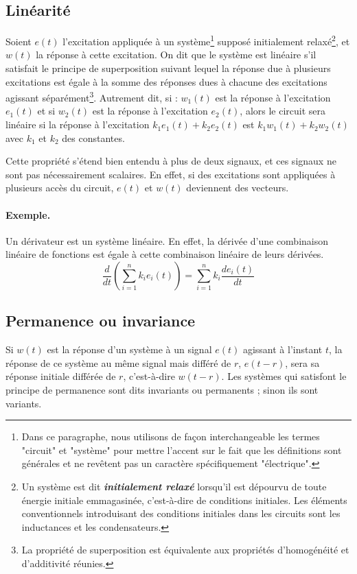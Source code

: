 \subsection{Linéarité}
Soient $e(t)$ l'excitation appliquée à un système\footnote{Dans ce paragraphe, nous utilisons de façon interchangeable les termes "circuit" et "système" pour mettre l'accent sur le fait que les définitions sont générales et ne revêtent pas un caractère spécifiquement "électrique".} supposé initialement relaxé\footnote{Un système est dit \textit{\textbf{initialement relaxé}} lorsqu'il est dépourvu de toute énergie initiale emmagasinée, c'est-à-dire de conditions initiales. Les éléments conventionnels introduisant des conditions initiales dans les circuits sont les inductances et les condensateurs.}, et 
$w(t)$ la réponse à cette excitation. On dit que le système est linéaire s'il satisfait le principe de superposition suivant lequel la réponse due à plusieurs excitations est égale à la somme des réponses dues à chacune des excitations agissant séparément\footnote{La propriété de superposition est équivalente aux propriétés d'homogénéité et d'additivité réunies.}. Autrement dit, si :
$w_1(t)$ est la réponse à l'excitation $e_1(t)$ et si
$w_2(t)$ est la réponse à l'excitation $e_2(t)$,
alors le circuit sera linéaire si la réponse à l'excitation
$k_1 e_1(t) + k_2 e_2(t)$ est $k_1 w_1(t) + k_2 w_2(t)$
avec $k_1$ et $k_2$ des constantes.

Cette propriété s'étend bien entendu à plus de deux signaux, et ces signaux ne sont pas nécessairement scalaires. En effet, si des  excitations sont appliquées à plusieurs accès du circuit, $e(t)$ et $w(t)$ deviennent des vecteurs.


\paragraph{Exemple.}
Un dérivateur est un système linéaire. En effet, la dérivée d'une combinaison linéaire de fonctions est égale à cette combinaison linéaire de leurs dérivées.
$$\frac{d}{dt}\left(\sum_{i=1}^n k_i e_i(t)\right) = \sum_{i=1}^n k_i \frac{d e_i(t)}{dt}$$

\subsection{Permanence ou invariance}
Si $w(t)$ est la réponse d'un système à un signal $e(t)$ agissant à l'instant $t$, la réponse de ce système au même signal mais différé de $r$, $e(t-r)$, sera sa réponse initiale différée de $r$, c'est-à-dire $w(t - r)$.
Les systèmes qui satisfont le principe de permanence sont dits invariants ou permanents ; sinon ils sont variants.

